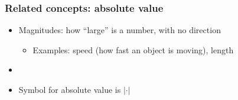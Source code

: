 \documentclass[11pt,dvipsnames]{beamer}
\newcommand{\myframe}[1]{\begin{frame} \frametitle{#1}}
\begin{document}

\myframe{Related concepts: absolute value}
\begin{itemize}
\item Magnitudes: how ``large'' is a number, with no direction
\begin{itemize}
\item Examples: speed (how fast an object is moving), length 
\end{itemize}
\item[] \pause
\item Symbol for absolute value is $|\cdot |$
\end{itemize}
\centering
{}
\end{frame}
\end{document}
